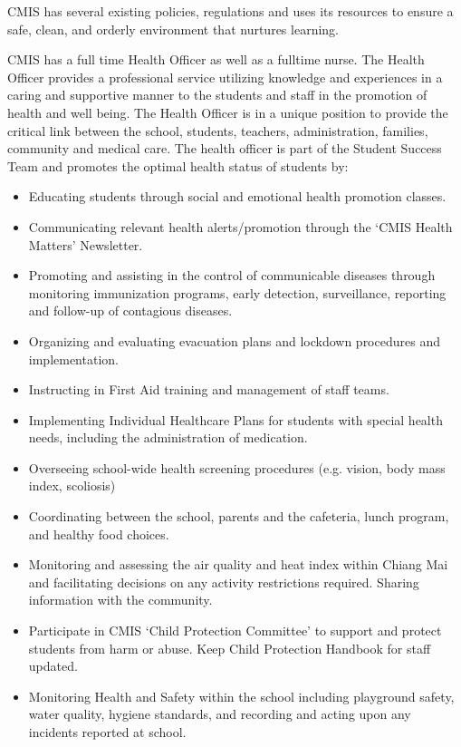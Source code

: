 \begin{findings}
CMIS has several existing policies, regulations and uses its resources to ensure a safe, clean, and orderly environment that nurtures learning.

CMIS has a full time Health Officer as well as a fulltime nurse. The Health Officer provides a professional service utilizing knowledge and experiences in a caring and supportive manner to the students and staff in the promotion of health and well being. The Health Officer is in a unique position to provide the critical link between the school, students, teachers, administration, families, community and medical care. The health officer is part of the Student Success Team and promotes the optimal health status of students by: 
	 	 	
\begin{itemize}
\item Educating students through social and emotional health promotion classes.
\item Communicating relevant health alerts/promotion through the ‘CMIS Health Matters’ Newsletter. 
\item Promoting and assisting in the control of communicable diseases through monitoring immunization programs, early detection, surveillance, reporting and follow-up of contagious diseases.
\item Organizing and evaluating evacuation plans and lockdown procedures and implementation. 
\item Instructing in First Aid training and management of staff teams.
\item Implementing Individual Healthcare Plans for students with special health needs, including the administration of medication.
\item Overseeing school-wide health screening procedures (e.g. vision, body mass index, scoliosis) 
\item Coordinating between the school, parents and the cafeteria, lunch program, and healthy food choices.
\item Monitoring and assessing the air quality and heat index within Chiang Mai and facilitating decisions on any activity restrictions required. Sharing information with the community.
\item Participate in CMIS ‘Child Protection Committee’ to support and protect students from harm  or abuse. Keep Child Protection Handbook  for staff updated.
\item Monitoring Health and Safety within the school including playground safety, water quality, hygiene standards, and recording and acting upon any incidents reported at school. 
\end{itemize}


\end{findings}
